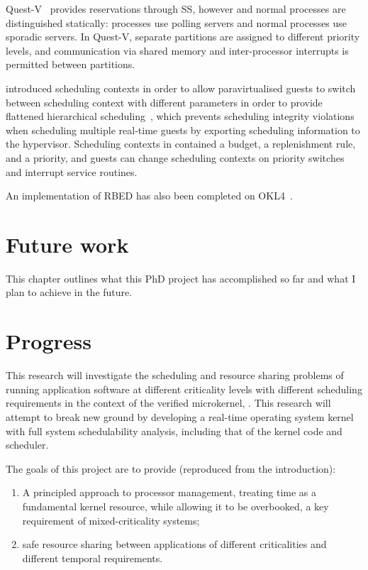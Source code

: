     Quest-V~\citep{Danish_LW_11} provides reservations through \gls{SS}, however \IO and normal processes
are distinguished statically: \IO processes use polling servers and normal processes use sporadic
servers. In Quest-V, separate partitions are assigned to
different priority levels, and communication via shared memory and inter-processor interrupts 
is permitted between partitions.


\fiascooc introduced scheduling contexts in order to allow paravirtualised guests to switch between
scheduling context with different parameters in order to provide flattened hierarchical
scheduling~\citep{Lackorzynski_WVH_12}, which prevents scheduling integrity violations
when scheduling multiple real-time guests by exporting scheduling information to the hypervisor.
Scheduling contexts in \fiascooc contained a budget, a
replenishment rule, and a priority, and guests 
can change scheduling contexts on priority switches and interrupt service routines.

An implementation of RBED has also been completed on OKL4~\citep{Petters_LHE_09}.

\section{Future work}



This chapter outlines what this PhD project has accomplished so far and what I plan to achieve in the future.

\section{Progress}

This research will investigate the scheduling and resource sharing problems of running application software at different criticality levels with different scheduling requirements in the context of the verified microkernel, \selfour.
This research will attempt to break new ground by developing a real-time operating system kernel with full system schedulability analysis, including that of the kernel code and scheduler.

The goals of this project are to provide (reproduced from the introduction):

\begin{enumerate}[label=\textbf{G\arabic*}]
  \item \label{G1} A principled approach to processor management, treating time as a fundamental kernel resource, while allowing it to be overbooked, a key requirement of mixed-criticality systems;
  \item \label{G2} safe resource sharing between applications of different criticalities and different temporal requirements.
\end{enumerate}

